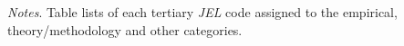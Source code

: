 \begin{table}
\begin{threeparttable}
\begin{tabular}{lp{13cm}}
            \bottomrule
        \end{tabular}
        \begin{tablenotes}
            \tiny
            \item \textit{Notes}. Table lists of each tertiary \textit{JEL} code assigned to the empirical, theory/methodology and other categories.
        \end{tablenotes}
    \end{threeparttable}
\end{table}